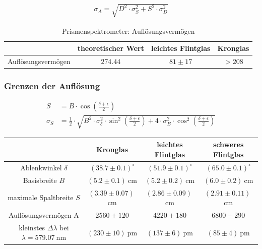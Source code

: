 \documentclass[12pt,a4paper,titlepage,headinclude,bibtotoc]{scrartcl}
\begin{document}
\begin{align}
\sigma_{A}=\sqrt{D^{2} \cdot \sigma_{S}^{2} + S^{2} \cdot \sigma_{D}^{2}}
\end{align}

\begin{table}[!htb]
	\centering
	\begin{tabular}{|c|c|c|c|}
		\hline		
		& theoretischer Wert & leichtes Flintglas &  Kronglas \\
		\hline
	    Auflösungsvermögen & $274.44$ & $81 \pm 17$ & $>208$ \\
		\hline		
	\end{tabular}
	\caption{Prismenspektrometer: Auflösungsvermögen}
	\label{tab:prismaA}
\end{table}

\subsubsection{Grenzen der Auflösung}

\begin{align}
	S&=B \cdot \cos{\left (\frac{\delta+\epsilon}{2}\right )}\\
\sigma_{S}&=\frac{1}{2} \cdot \sqrt{B^{2} \cdot \sigma_{\delta}^{2} \cdot \sin^{2}{\left (\frac{\delta+\epsilon}{2} \right )} + 4 \cdot \sigma_{B}^{2} \cdot \cos^{2}{\left (\frac{\delta+\epsilon}{2} \right )}}
\end{align}

\begin{table}[!htb]
	\centering
	\begin{tabular}{|c|c|c|c|}
		\hline		
		& Kronglas & leichtes Flintglas & schweres Flintglas \\
		\hline
	    Ablenkwinkel $\delta$ & $(38.7\pm 0.1)^\circ$ &  $(51.9\pm 0.1)^\circ$ & $(65.0\pm 0.1)^\circ$ \\
	    Basisbreite $B$ & $(5.2 \pm 0.1)~$cm & $(5.2 \pm 0.2)~$cm &$(6.0 \pm 0.2)~$cm \\
	    maximale Spaltbreite $S$ & $(3.39 \pm 0.07)~$cm & $(2.86 \pm 0.09)~$cm & $(2.91 \pm 0.11)~$cm \\
	    Auflösungsvermögen A& $2560 \pm 120$ & $4220 \pm 180$ & $6800 \pm 290$ \\
		kleinstes $\Delta \lambda$ bei $\lambda=579.07~$nm& $(230 \pm 10)~$pm & $(137 \pm 6)~$pm& $(85 \pm 4)~$pm \\
		\hline
	\end{tabular}
\end{table}
\end{document}
